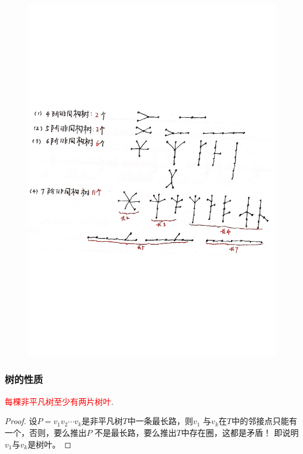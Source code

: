\begin{definition}
\begin{note}
\begin{figure}[H]
	\includegraphics[scale=0.4]{image/CH2_tree.pdf}  
	\label{figff1ik}  
\end{figure}
\end{note}
	
\end{definition}

\subsubsection{树的性质}
\begin{theorem}
\label{hhh}
\textcolor{red}{每棵非平凡树至少有两片树叶}.
\end{theorem}
\begin{proof}
设$P=v_1v_2\cdots v_k$是非平凡树$T$中一条最长路，则$v_1$
与$v_k$在$T$中的邻接点只能有一个，否则，要么推出$P$
不是最长路，要么推出$T$中存在圈，这都是矛盾！
即说明$v_1$与$v_k$是树叶。
\end{proof}

